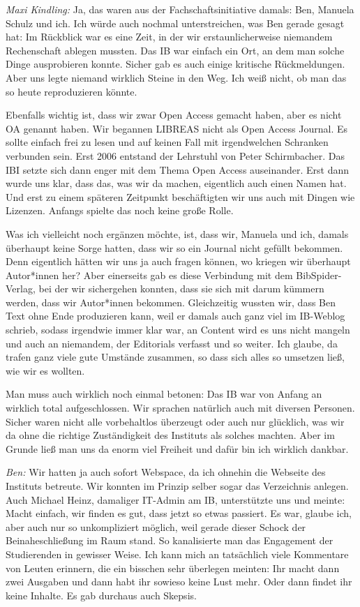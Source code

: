 \documentclass[a4paper,
fontsize=11pt,
oneside,
numbers=noperiodatend,
parskip=half-,
bibliography=totoc,
final
]{scrartcl}
\begin{document}
\emph{Maxi Kindling:} Ja, das waren aus der Fachschaftsinitiative
damals: Ben, Manuela Schulz und ich. Ich würde auch nochmal
unterstreichen, was Ben gerade gesagt hat: Im Rückblick war es eine
Zeit, in der wir erstaunlicherweise niemandem Rechenschaft ablegen
mussten. Das IB war einfach ein Ort, an dem man solche Dinge
ausprobieren konnte. Sicher gab es auch einige kritische Rückmeldungen.
Aber uns legte niemand wirklich Steine in den Weg. Ich weiß nicht, ob
man das so heute reproduzieren könnte.

Ebenfalls wichtig ist, dass wir zwar Open Access gemacht haben, aber es
nicht OA genannt haben. Wir begannen LIBREAS nicht als Open Access
Journal. Es sollte einfach frei zu lesen und auf keinen Fall mit
irgendwelchen Schranken verbunden sein. Erst 2006 entstand der Lehrstuhl
von Peter Schirmbacher. Das IBI setzte sich dann enger mit dem Thema
Open Access auseinander. Erst dann wurde uns klar, dass das, was wir da
machen, eigentlich auch einen Namen hat. Und erst zu einem späteren
Zeitpunkt beschäftigten wir uns auch mit Dingen wie Lizenzen. Anfangs
spielte das noch keine große Rolle.

Was ich vielleicht noch ergänzen möchte, ist, dass wir, Manuela und ich,
damals überhaupt keine Sorge hatten, dass wir so ein Journal nicht
gefüllt bekommen. Denn eigentlich hätten wir uns ja auch fragen können,
wo kriegen wir überhaupt Autor*innen her? Aber einerseits gab es diese
Verbindung mit dem BibSpider-Verlag, bei der wir sichergehen konnten,
dass sie sich mit darum kümmern werden, dass wir Autor*innen bekommen.
Gleichzeitig wussten wir, dass Ben Text ohne Ende produzieren kann, weil
er damals auch ganz viel im IB-Weblog schrieb, sodass irgendwie immer
klar war, an Content wird es uns nicht mangeln und auch an niemandem,
der Editorials verfasst und so weiter. Ich glaube, da trafen ganz viele
gute Umstände zusammen, so dass sich alles so umsetzen ließ, wie wir es
wollten.

Man muss auch wirklich noch einmal betonen: Das IB war von Anfang an
wirklich total aufgeschlossen. Wir sprachen natürlich auch mit diversen
Personen. Sicher waren nicht alle vorbehaltlos überzeugt oder auch nur
glücklich, was wir da ohne die richtige Zuständigkeit des Instituts als
solches machten. Aber im Grunde ließ man uns da enorm viel Freiheit und
dafür bin ich wirklich dankbar.

\emph{Ben:} Wir hatten ja auch sofort Webspace, da ich ohnehin die
Webseite des Instituts betreute. Wir konnten im Prinzip selber sogar das
Verzeichnis anlegen. Auch Michael Heinz, damaliger IT-Admin am IB,
unterstützte uns und meinte: Macht einfach, wir finden es gut, dass
jetzt so etwas passiert. Es war, glaube ich, aber auch nur so
unkompliziert möglich, weil gerade dieser Schock der Beinaheschließung
im Raum stand. So kanalisierte man das Engagement der Studierenden in
gewisser Weise. Ich kann mich an tatsächlich viele Kommentare von Leuten
erinnern, die ein bisschen sehr überlegen meinten: Ihr macht dann zwei
Ausgaben und dann habt ihr sowieso keine Lust mehr. Oder dann findet ihr
keine Inhalte. Es gab durchaus auch Skepsis.
\end{document}
